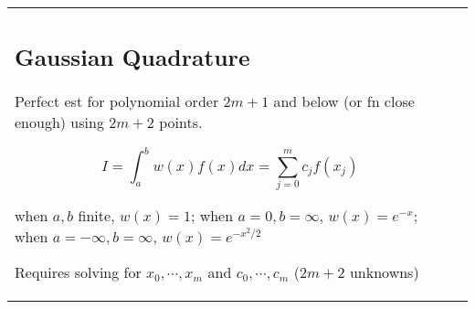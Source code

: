 \begin{tabulary}{\textwidth}{l L}
\subsection{Gaussian Quadrature}

Perfect est for polynomial order $2m+1$ and below (or fn close enough) using $2m+2$ points.

$$
I = \int_a^b w(x) f(x) dx = \sum_{j=0}^m c_j f(x_j)
$$

when $a, b$ finite, $w(x)=1$; when $a=0, b=\infty$, $w(x) = e^{-x}$; when $a=-\infty, b=\infty$, $w(x) = e^{-x^2/2}$

Requires solving for $x_0, \cdots, x_m$ and $c_0, \cdots, c_m$ ($2m+2$ unknowns)

\end{tabulary}